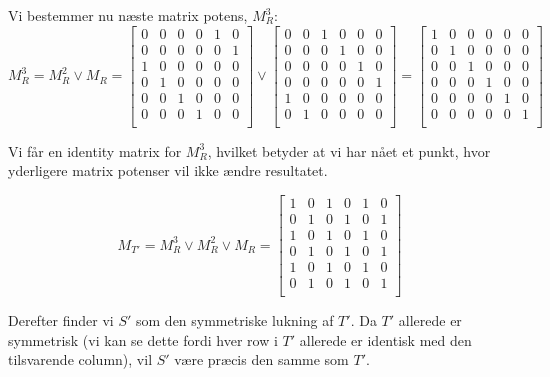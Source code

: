 \documentclass[a4paper,12pt]{article}
\begin{document}
Vi bestemmer nu næste matrix potens, $M^3_R$:
\[M^3_R = M^2_R \lor M_R =
\begin{bmatrix}
    0 & 0 & 0 & 0 & 1 & 0 \\
    0 & 0 & 0 & 0 & 0 & 1 \\
    1 & 0 & 0 & 0 & 0 & 0 \\
    0 & 1 & 0 & 0 & 0 & 0 \\
    0 & 0 & 1 & 0 & 0 & 0 \\
    0 & 0 & 0 & 1 & 0 & 0 \\
\end{bmatrix}
\lor
\begin{bmatrix}
    0 & 0 & 1 & 0 & 0 & 0 \\
    0 & 0 & 0 & 1 & 0 & 0 \\
    0 & 0 & 0 & 0 & 1 & 0 \\
    0 & 0 & 0 & 0 & 0 & 1 \\
    1 & 0 & 0 & 0 & 0 & 0 \\
    0 & 1 & 0 & 0 & 0 & 0 \\
\end{bmatrix}
=
\begin{bmatrix}
    1 & 0 & 0 & 0 & 0 & 0 \\
    0 & 1 & 0 & 0 & 0 & 0 \\
    0 & 0 & 1 & 0 & 0 & 0 \\
    0 & 0 & 0 & 1 & 0 & 0 \\
    0 & 0 & 0 & 0 & 1 & 0 \\
    0 & 0 & 0 & 0 & 0 & 1 \\
\end{bmatrix}
\]

Vi får en identity matrix for $M^3_R$, hvilket betyder at vi har nået et punkt, hvor yderligere matrix potenser vil ikke ændre resultatet.

\[
M_{T'} = M^3_R \lor M^2_R \lor M_R =
\begin{bmatrix}
    1 & 0 & 1 & 0 & 1 & 0 \\
    0 & 1 & 0 & 1 & 0 & 1 \\
    1 & 0 & 1 & 0 & 1 & 0 \\
    0 & 1 & 0 & 1 & 0 & 1 \\
    1 & 0 & 1 & 0 & 1 & 0 \\
    0 & 1 & 0 & 1 & 0 & 1 \\
\end{bmatrix}
\]

Derefter finder vi $S'$ som den symmetriske lukning af $T'$. Da $T'$ allerede er symmetrisk (vi kan se dette fordi hver row i $T'$ allerede er identisk med den tilsvarende column), vil $S'$ være præcis den samme som $T'$.
\end{document}
